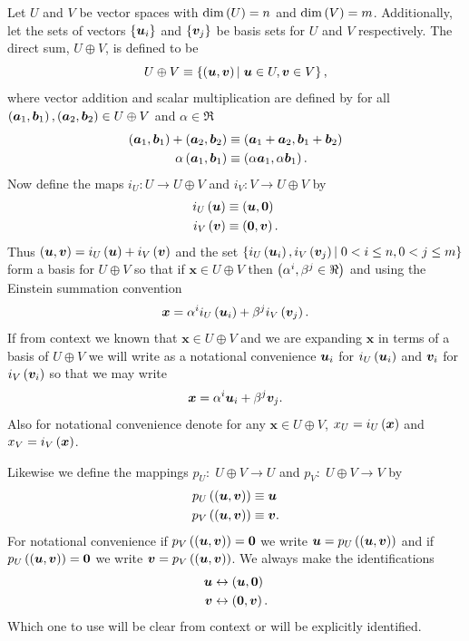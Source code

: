 Let $U$ and $V$ be vector spaces with ${\dim}\left ( {U} \right ) = n$ and ${\dim}\left ( {V} \right ) = m$.  Additionally, let the sets of vectors $\left \{ {\bm{u}_{i}} \right \}$ and
$\left \{ {\bm{v}_{j}} \right \}$ be basis sets for $U$ and $V$ respectively.  The direct sum, $U\oplus V$, is defined to be
\begin{equation}
	U\oplus V \equiv \left \{ {\left ( {\bm{u},\bm{v}} \right )| \;\bm{u}\in U, \bm{v}\in V } \right \},
\end{equation}
where vector addition and scalar multiplication are defined by for all 
$\left ( {\bm{a}_{1},\bm{b}_{1}} \right ),\left ( {\bm{a}_{2},\bm{b}_{2}} \right )\in U\oplus V$ and $\alpha\in\Re$
\begin{align}
	\left ( {\bm{a}_{1},\bm{b}_{1}} \right ) + \left ( {\bm{a}_{2},\bm{b}_{2}} \right ) &\equiv \left ( {\bm{a}_{1}+\bm{a}_{2},\bm{b}_{1}+\bm{b}_{2}} \right ) \\
	\alpha \left ( {\bm{a}_{1},\bm{b}_{1}} \right ) &\equiv \left ( {\alpha\bm{a}_{1},\alpha\bm{b}_{1}} \right ).
\end{align}
Now define the maps $i_{U}:U\rightarrow U\oplus V$ and $i_{V}:V\rightarrow U\oplus V$ by
\begin{align}
	{i_{U}}\left ( {\bm{u}} \right ) &\equiv \left ( {\bm{u},\bm{0}} \right ) \\
	{i_{V}}\left ( {\bm{v}} \right ) &\equiv \left ( {\bm{0},\bm{v}} \right ).
\end{align}
Thus $\left ( {\bm{u},\bm{v}} \right ) = {i_{U}}\left ( {\bm{u}} \right ) + {i_{V}}\left ( {\bm{v}} \right )$ and the set $\left \{ {{i_{U}}\left ( {\bm{u}_{i}} \right ),{i_{V}}\left ( {\bm{v}_{j}} \right )|\; 0<i\le n, 0<j\le m} \right \}$
form a basis for $U\oplus V$ so that if $\bm{x}\in U\oplus V$ then $\left ( {\alpha^{i}, \beta^{j} \in \Re} \right )$ and using the Einstein summation
convention
\begin{equation}
	\bm{x} = \alpha^{i}{i_{U}}\left ( {\bm{u}_{i}} \right ) + \beta^{j}{i_{V}}\left ( {\bm{v}_{j}} \right ).
\end{equation}
If from context we known that $\bm{x}\in U\oplus V$ and we are expanding $\bm{x}$ in terms of a basis of $U\oplus V$ 
we will write as a notational convenience $\bm{u}_{i}$ for ${i_{U}}\left ( {\bm{u}_{i}} \right )$ and $\bm{v}_{i}$ for ${i_{V}}\left ( {\bm{v}_{i}} \right )$
so that we may write
\begin{equation}
	\bm{x} = \alpha^{i}\bm{u}_{i} + \beta^{j}\bm{v}_{j}.
\end{equation}
Also for notational convenience denote for any $\bm{x}\in U\oplus V$, $x_{U} = {i_{U}}\left ( {\bm{x}} \right )$ and $x_{V} = {i_{V}}\left ( {\bm{x}} \right )$.

Likewise we define the mappings $p_{U}:\; U\oplus V\rightarrow U$ and $p_{V}:\; U\oplus V\rightarrow V$ by
\begin{align}
	{p_{U}}\left ( {\left ( {\bm{u},\bm{v}} \right )} \right ) &\equiv \bm{u} \\
	{p_{V}}\left ( {\left ( {\bm{u},\bm{v}} \right )} \right ) &\equiv \bm{v}.
\end{align}
For notational convenience if ${p_{V}}\left ( {\left ( {\bm{u},\bm{v}} \right )} \right ) = \bm{0}$ we write $\bm{u} = {p_{U}}\left ( {\left ( {\bm{u},\bm{v}} \right )} \right )$ and if
${p_{U}}\left ( {\left ( {\bm{u},\bm{v}} \right )} \right ) = \bm{0}$ we write $\bm{v} = {p_{V}}\left ( {\left ( {\bm{u},\bm{v}} \right )} \right )$.  We always make the identifications
\begin{align*}
	\bm{u} &\leftrightarrow \left ( {\bm{u},\bm{0}} \right ) \\
	\bm{v} &\leftrightarrow \left ( {\bm{0},\bm{v}} \right ).
\end{align*}
Which one to use will be clear from context or will be explicitly identified.

